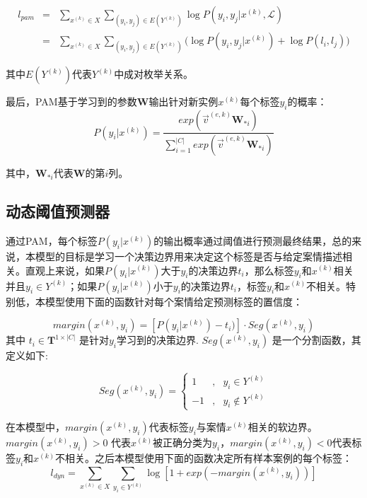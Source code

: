 \begin{eqnarray}\label{eq:pam}
l_{pam}&=&\sum_{x^{(k)}\in X}\sum_{(y_i,y_j)\in E(Y^{(k)})}\log P(y_i,y_j|x^{(k)},\mathcal{L})\\\nonumber
&=&\sum_{x^{(k)}\in X}\sum_{(y_i,y_j)\in E(Y^{(k)})}\Big(\log P(y_i,y_j|x^{(k)})+\log P(l_i,l_j)\Big)
\end{eqnarray}

其中$ E(Y^{(k)})$代表$Y^{(k)}$中成对枚举关系。

最后，PAM基于学习到的参数$\textbf{W}$输出针对新实例$x^{(k)}$每个标签$y_i$的概率：
$$
P(y_i|x^{(k)})=\frac{exp(\vec{v}^{(e,k)}\textbf{W}_{*i})}{\sum_{i=1}^{|C|}exp(\vec{v}^{(e,k)}\textbf{W}_{*i})}
$$

其中，$\textbf{W}_{*i}$代表$\textbf{W}$的第$i$列。

\subsection{动态阈值预测器}
通过PAM，每个标签$P(y_i|x^{(k)})$的输出概率通过阈值进行预测最终结果，总的来说，本模型的目标是学习一个决策边界用来决定这个标签是否与给定案情描述相关。直观上来说，如果$P(y_i|x^{(k)})$大于$y_i$的决策边界$t_i$，那么标签$y_i$和$x^{(k)}$相关并且$y_i\in Y^{(k)}$；如果$P(y_i|x^{(k)})$小于$y_i$的决策边界$t_i$，标签$y_i$和$x^{(k)}$不相关。特别低，本模型使用下面的函数针对每个案情给定预测标签的置信度：

\begin{equation}
margin(x^{(k)},y_i)=[P(y_i|x^{(k)})-t_i)]\cdot Seg(x^{(k)},y_i)
\end{equation}
其中 $t_i\in \textbf{T}^{1\times |C|}$ 是针对$y_i$学习到的决策边界. $Seg(x^{(k)},y_i)$ 是一个分割函数，其定义如下:


\begin{displaymath}
Seg(x^{(k)},y_i)=\left\{
\begin{aligned}
1 & , & y_i\in Y^{(k)} \\
-1 &, & y_i\notin Y^{(k)}
\end{aligned}
\right.
\end{displaymath}

在本模型中，$margin(x^{(k)},y_i)$代表标签$y_i$与案情$x^{(k)}$相关的软边界。$margin(x^{(k)},y_i)>0$ 代表$x^{(k)}$被正确分类为$y_i$，$margin(x^{(k)},y_i)<0$代表标签$y_i$和$x^{(k)}$不相关。之后本模型使用下面的函数决定所有样本案例的每个标签：
\begin{equation}\label{eq:dyn}
l_{dyn}=\sum_{x^{(k)}\in X}\sum_{y_i\in Y^{(k)}}\log\left[1+exp(-margin(x^{(k)},y_i))\right]
\end{equation}

